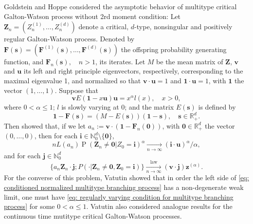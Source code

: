 \documentclass[12pt, a4paper]{amsart}
\theoremstyle{definition}
\numberwithin{equation}{section}
\begin{document}
	Goldstein and Hoppe \cite{GoldsteinHoppe1978Critical} considered the asymptotic behavior of multitype critical Galton-Watson process without 2rd moment condition:
	Let $\mathbf Z_n=(Z_n^{(1)}, \dots, Z_n^{(d)})$ denote a critical, $d$-type, nonsingular and positively regular Galton-Watson process.
	Denoted by $\mathbf F(\mathbf s) = (\mathbf F^{(1)}(\mathbf s), \dots, \mathbf F^{(d)}(\mathbf s))$ the offspring probability generating function,
	and  $\mathbf F_n(\mathbf s), \quad n>1$, its iterates. 
	Let $M$ be the mean matrix of $\mathbf Z$, $\mathbf v$ and $\mathbf u$ its left and right principle eigenvectors, respectively, corresponding to the maximal eigenvalue 1, and normalized so that $\mathbf v \cdot \mathbf u = 1$ and $\mathbf 1 \cdot \mathbf u = 1$, with $\mathbf 1$ the vector $(1,\dots, 1)$.
	Suppose that
\[\label{eq: regularly varying condition for multitype branching process}
	\mathbf v E(\mathbf 1-x\mathbf u) \mathbf u
	= x^\alpha l(x),
	\quad x > 0,
\]
	where $0 < \alpha \leq 1$; $l$ is slowly varying at $0$; and  the matrix $E(\mathbf s)$ is defined by
\[
	\mathbf 1 - \mathbf F(\mathbf s)
	= (M - E(\mathbf s))(\mathbf 1 - \mathbf s),
	\quad \mathbf s \in \mathbb R_+^d.
\]
Then \cite{GoldsteinHoppe1978Critical} showed that,
	if we let $a_n := \mathbf v \cdot (\mathbf 1 - \mathbf F_n(\mathbf 0))$, with $\mathbf 0 \in \mathbb R_+^d$ the vector $(0,\dots, 0)$, then for each $\mathbf i \in \mathbb N_0^d \setminus \{\mathbf 0\}$,
\[ \label{eq: limit behavior of the exitinction probability without finite variance of multitype branching processes}
	n L(a_n) \operatorname{P}(\mathbf Z_n \neq \mathbf 0| Z_0 = \mathbf i)^\alpha
	\xrightarrow[n\to \infty]{} (\mathbf i \cdot \mathbf u)^\alpha / \alpha,
\]
	and for each $\mathbf j \in \mathbb N_0^d$
\[\label{eq: conditioned normalized multitype branching process}
	\{ a_n \mathbf Z_n \cdot \mathbf j ; P(\cdot | \mathbf Z_n \neq \mathbf 0, \mathbf Z_0 = \mathbf i)\}
	\xrightarrow[n\to \infty]{\operatorname{law}} (\mathbf v\cdot \mathbf j) \mathbf z^{(\alpha)}.
\]
	For the converse of this problem, Vatutin \cite{Vatutin1977Limit} showed that in order the left side of \eqref{eq: conditioned normalized multitype branching process} has a non-degenerate weak limit, one must have \eqref{eq: regularly varying condition for multitype branching process} for some $0 < \alpha \leq 1$.
	Vatutin \cite{Vatutin1977Limit} also considered analogue results for the continuous time mutitype critical Galton-Watson processes.
	
\end{document}
